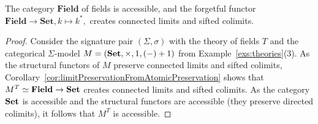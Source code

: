 \begin{corollary}
    The category $\mathbf{Field}$ of fields is accessible, and the forgetful functor $\mathbf{Field}\to \mathbf{Set}, k\mapsto k^*,$ creates connected limits and sifted colimits.
\end{corollary}
\begin{proof}
    Consider the signature pair $(\Sigma,\sigma)$ with the theory of fields $T$ and the categorical $\Sigma$-model $M = (\mathbf{Set}, \times, 1, (-)+1)$ from Example~\ref{exs:theories}(3). As the structural functors of $M$ preserve connected limits and sifted colimits, Corollary~\ref{cor:limitPreservationFromAtomicPreservation} shows that $M^T\simeq \textbf{Field}\to \mathbf{Set}$ creates connected limits and sifted colimits. As the category $\mathbf{Set}$ is accessible and the structural functors are accessible (they preserve directed colimits), it follows that $M^T$ is accessible.
\end{proof}
